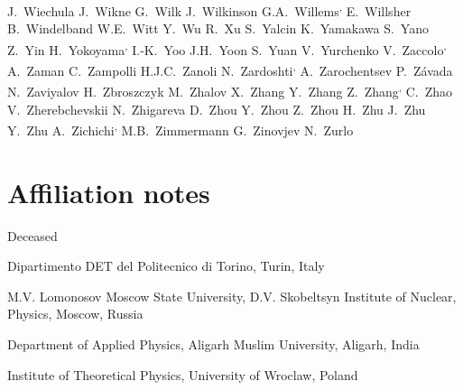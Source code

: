 \begin{flushleft}
J.~Wiechula\And 
J.~Wikne\And 
G.~Wilk\And 
J.~Wilkinson\And 
G.A.~Willems\textsuperscript{,}\And 
E.~Willsher\And 
B.~Windelband\And 
W.E.~Witt\And 
Y.~Wu\And 
R.~Xu\And 
S.~Yalcin\And 
K.~Yamakawa\And 
S.~Yano\And 
Z.~Yin\And 
H.~Yokoyama\textsuperscript{,}\And 
I.-K.~Yoo\And 
J.H.~Yoon\And 
S.~Yuan\And 
V.~Yurchenko\And 
V.~Zaccolo\textsuperscript{,}\And 
A.~Zaman\And 
C.~Zampolli\And 
H.J.C.~Zanoli\And 
N.~Zardoshti\textsuperscript{,}\And 
A.~Zarochentsev\And 
P.~Z\'{a}vada\And 
N.~Zaviyalov\And 
H.~Zbroszczyk\And 
M.~Zhalov\And 
X.~Zhang\And 
Y.~Zhang\And 
Z.~Zhang\textsuperscript{,}\And 
C.~Zhao\And 
V.~Zherebchevskii\And 
N.~Zhigareva\And 
D.~Zhou\And 
Y.~Zhou\And 
Z.~Zhou\And 
H.~Zhu\And 
J.~Zhu\And 
Y.~Zhu\And 
A.~Zichichi\textsuperscript{,}\And 
M.B.~Zimmermann\And 
G.~Zinovjev\And 
N.~Zurlo\And
\renewcommand\labelenumi{\textsuperscript{\theenumi}~}

\section*{Affiliation notes}
\renewcommand\theenumi{\roman{enumi}}
\begin{Authlist}
\item {}Deceased
\item {}Dipartimento DET del Politecnico di Torino, Turin, Italy
\item {}M.V. Lomonosov Moscow State University, D.V. Skobeltsyn Institute of Nuclear, Physics, Moscow, Russia
\item {}Department of Applied Physics, Aligarh Muslim University, Aligarh, India
\item {}Institute of Theoretical Physics, University of Wroclaw, Poland
\end{Authlist}


\end{flushleft}

